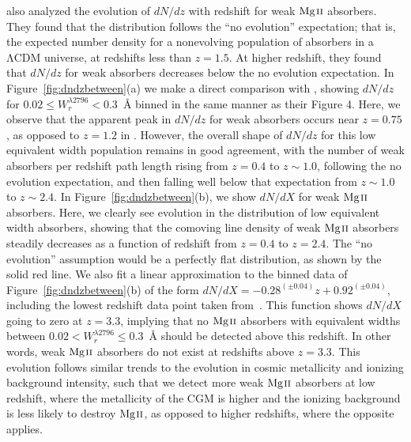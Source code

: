 \documentclass[iop,apj,numberedappendix,appendixfloats,twocolappendix]{emulateapj}
\begin{document}
\cite{Narayanan2007} also analyzed the evolution of $dN\!/dz$ with redshift for weak ${\hbox{{\rm Mg}\kern 0.1em{\sc ii}}}$ absorbers. They found that the distribution follows the ``no evolution'' expectation; that is, the expected number density for a nonevolving population of absorbers in a $\mathrm{\Lambda CDM}$ universe, at redshifts less than $z = 1.5$. At higher redshift, they found that $dN\!/dz$ for weak absorbers decreases below the no evolution expectation. In Figure~\ref{fig:dndzbetween}(a) we make a direct comparison with \cite{Narayanan2007}, showing $dN\!/dz$ for $0.02 \le W_r^{\lambda2796} < 0.3$~{\AA} binned in the same manner as their Figure 4. Here, we observe that the apparent peak in $dN\!/dz$ for weak absorbers occurs near $z = 0.75$, as opposed to $z = 1.2$ in \cite{Narayanan2007}. However, the overall shape of $dN\!/dz$ for this low equivalent width population remains in good agreement, with the number of weak absorbers per redshift path length rising from $z = 0.4$ to $z \sim 1.0$, following the no evolution expectation, and then falling well below that expectation from $z \sim 1.0$ to $z \sim 2.4$. In Figure~\ref{fig:dndzbetween}(b), we show $dN\!/dX$ for weak ${\hbox{{\rm Mg}\kern 0.1em{\sc ii}}}$ absorbers. Here, we clearly see evolution in the distribution of low equivalent width absorbers, showing that the comoving line density of weak ${\hbox{{\rm Mg}\kern 0.1em{\sc ii}}}$ absorbers steadily decreases as a function of redshift from $z = 0.4$ to $z = 2.4$. The ``no evolution'' assumption would be a perfectly flat distribution, as shown by the solid red line. We also fit a linear approximation to the binned data of Figure~\ref{fig:dndzbetween}(b) of the form $dN\!/dX = -0.28^{(\pm0.04)}z + 0.92^{(\pm0.04)}$, including the lowest redshift data point taken from~\cite{Narayanan2005}. This function shows $dN\!/dX$ going to zero at $z = 3.3$, implying that no ${\hbox{{\rm Mg}\kern 0.1em{\sc ii}}}$ absorbers with equivalent widths between $0.02 < W_{r}^{\lambda2796} \le 0.3$~{\AA} should be detected above this redshift. In other words, weak ${\hbox{{\rm Mg}\kern 0.1em{\sc ii}}}$ absorbers do not exist at redshifts above $z = 3.3$. This evolution follows similar trends to the evolution in cosmic metallicity and ionizing background intensity, such that we detect more weak ${\hbox{{\rm Mg}\kern 0.1em{\sc ii}}}$ absorbers at low redshift, where the metallicity of the CGM is higher and the ionizing background is less likely to destroy ${\hbox{{\rm Mg}\kern 0.1em{\sc ii}}}$, as opposed to higher redshifts, where the opposite applies.
\end{document}
